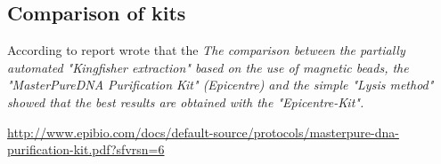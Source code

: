 \subsection{Comparison of kits}
\label{task:20180119_cj0}

According to report \citet{reynisson2010optimization} wrote that the \textit{The comparison between the partially automated "Kingfisher extraction" based on the use of magnetic beads, the "MasterPure\texttrademark DNA Purification Kit" (Epicentre) and the simple "Lysis method" showed that the best results are obtained with the "Epicentre-Kit".}




\url{http://www.epibio.com/docs/default-source/protocols/masterpure-dna-purification-kit.pdf?sfvrsn=6}